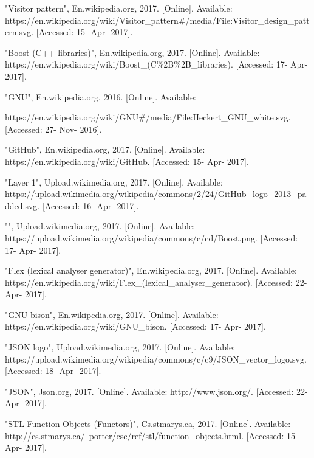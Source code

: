 \begin{thebibliography}{22}
 \bibitem{} "Visitor pattern", En.wikipedia.org, 2017. [Online]. Available: https://en.wikipedia.org/wiki/Visitor\_pattern\#/media/File:Visitor\_design\_pattern.svg. [Accessed: 15- Apr- 2017].

 \bibitem{} "Boost (C++ libraries)", En.wikipedia.org, 2017. [Online]. Available: https://en.wikipedia.org/wiki/Boost\_(C\%2B\%2B\_libraries). [Accessed: 17- Apr- 2017].
 
 \bibitem{} "GNU", En.wikipedia.org, 2016. [Online]. Available: 
 
 https://en.wikipedia.org/wiki/GNU\#/media/File:Heckert\_GNU\_white.svg. [Accessed: 27- Nov- 2016].
 
 \bibitem{} "GitHub", En.wikipedia.org, 2017. [Online]. Available: https://en.wikipedia.org/wiki/GitHub. [Accessed: 15- Apr- 2017].

\bibitem{} "Layer 1", Upload.wikimedia.org, 2017. [Online]. Available: https://upload.wikimedia.org/wikipedia/commons/2/24/GitHub\_logo\_2013\_padded.svg. [Accessed: 16- Apr- 2017].
 
\bibitem{} "", Upload.wikimedia.org, 2017. [Online]. Available: https://upload.wikimedia.org/wikipedia/commons/c/cd/Boost.png. [Accessed: 17- Apr- 2017].

\bibitem{} "Flex (lexical analyser generator)", En.wikipedia.org, 2017. [Online]. Available: https://en.wikipedia.org/wiki/Flex\_(lexical\_analyser\_generator). [Accessed: 22- Apr- 2017].

\bibitem{} "GNU bison", En.wikipedia.org, 2017. [Online]. Available: https://en.wikipedia.org/wiki/GNU\_bison. [Accessed: 17- Apr- 2017].

\bibitem{} "JSON logo", Upload.wikimedia.org, 2017. [Online]. Available: https://upload.wikimedia.org/wikipedia/commons/c/c9/JSON\_vector\_logo.svg. [Accessed: 18- Apr- 2017].

\bibitem{} "JSON", Json.org, 2017. [Online]. Available: http://www.json.org/. [Accessed: 22- Apr- 2017].

\bibitem{} "STL Function Objects (Functors)", Cs.stmarys.ca, 2017. [Online]. Available: http://cs.stmarys.ca/~porter/csc/ref/stl/function\_objects.html. [Accessed: 15- Apr- 2017].

\end{thebibliography}